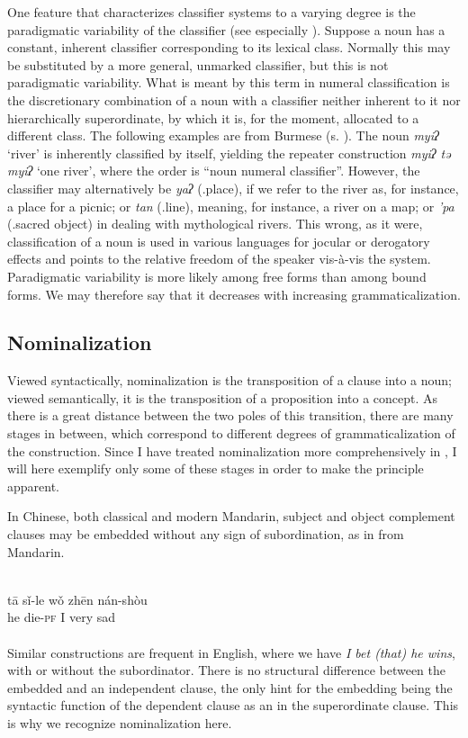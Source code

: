 \label{page65}One feature that characterizes classifier systems to a varying degree is the paradigmatic variability of the classifier (see especially \citealt{Serzisko1982}). Suppose a noun has a constant, inherent classifier corresponding to its lexical class. Normally this may be substituted by a more general, unmarked classifier, but this is not paradigmatic variability. What is meant by this term in numeral classification is the discretionary combination of a noun with a classifier neither inherent to it nor hierarchically superordinate, by which it is, for the moment, allocated to a different class. The following examples are from Burmese (s. \citealt[20]{Serzisko1980}). The noun \textit{myiʔ} ‘river’ is inherently classified by itself, yielding the repeater construction \textit{myiʔ tə myiʔ} ‘one river’, where the order is ``noun numeral classifier''. However, the classifier may alternatively be \textit{yaʔ} (\cl.place), if we refer to the river as, for instance, a place for a picnic; or \textit{tan} (\cl.line), meaning, for instance, a river on a map; or \textit{'pa} (\cl.sacred object) in dealing with mythological rivers. This wrong, as it were, classification of a noun is used in various languages for jocular or derogatory effects and points to the relative freedom of the speaker vis-à-vis the system. Paradigmatic variability is more likely among free forms than among bound forms. We may therefore say that it decreases with increasing grammaticalization.

\subsection{Nominalization} \label{sec:3.3.2}

Viewed syntactically, nominalization is the transposition of a clause into a noun; viewed semantically, it is the transposition of a proposition into a concept. As there is a great distance between the two poles of this transition, there are many stages in between, which correspond to different degrees of grammaticalization of the construction. Since I have treated nominalization more comprehensively in \citealt{Lehmann1982a}, I will here exemplify only some of these stages in order to make the principle apparent.

In Chinese, both classical and modern Mandarin, subject and object complement clauses may be embedded without any sign of subordination, as in  from Mandarin.

\ea\label{ex:E25}
\\
\gll   t\=a  s\v{i}-le  w\v{o}  zh\=en  nán-shòu\\
 he  die-\textsc{pf}  I  very  sad\\
\\
\z
\noindent Similar constructions are frequent in English, where we have \textit{I bet (that) he wins}, with or without the subordinator. There is no structural difference between the embedded and an independent clause, the only hint for the embedding being the syntactic function of the dependent clause as an \np in the superordinate clause. This is why we recognize nominalization here.


